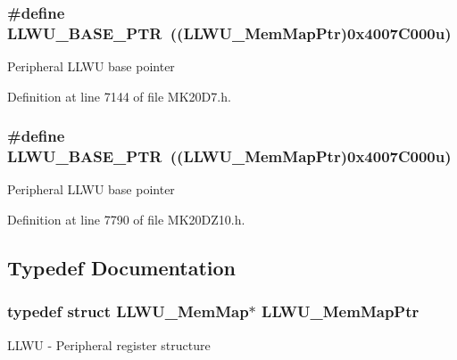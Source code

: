 \subsubsection[{\texorpdfstring{L\+L\+W\+U\+\_\+\+B\+A\+S\+E\+\_\+\+P\+TR}{LLWU_BASE_PTR}}]{\setlength{\rightskip}{0pt plus 5cm}\#define L\+L\+W\+U\+\_\+\+B\+A\+S\+E\+\_\+\+P\+TR~(({\bf L\+L\+W\+U\+\_\+\+Mem\+Map\+Ptr})0x4007\+C000u)}\hypertarget{group___l_l_w_u___peripheral_ga89c97b9e8756088cb3d8617c022ae6ac}{}\label{group___l_l_w_u___peripheral_ga89c97b9e8756088cb3d8617c022ae6ac}
Peripheral L\+L\+WU base pointer 

Definition at line 7144 of file M\+K20\+D7.\+h.

\subsubsection[{\texorpdfstring{L\+L\+W\+U\+\_\+\+B\+A\+S\+E\+\_\+\+P\+TR}{LLWU_BASE_PTR}}]{\setlength{\rightskip}{0pt plus 5cm}\#define L\+L\+W\+U\+\_\+\+B\+A\+S\+E\+\_\+\+P\+TR~(({\bf L\+L\+W\+U\+\_\+\+Mem\+Map\+Ptr})0x4007\+C000u)}\hypertarget{group___l_l_w_u___peripheral_ga89c97b9e8756088cb3d8617c022ae6ac}{}\label{group___l_l_w_u___peripheral_ga89c97b9e8756088cb3d8617c022ae6ac}
Peripheral L\+L\+WU base pointer 

Definition at line 7790 of file M\+K20\+D\+Z10.\+h.



\subsection{Typedef Documentation}
\subsubsection[{\texorpdfstring{L\+L\+W\+U\+\_\+\+Mem\+Map\+Ptr}{LLWU_MemMapPtr}}]{\setlength{\rightskip}{0pt plus 5cm}typedef struct {\bf L\+L\+W\+U\+\_\+\+Mem\+Map}$\ast$ {\bf L\+L\+W\+U\+\_\+\+Mem\+Map\+Ptr}}\hypertarget{group___l_l_w_u___peripheral_ga03cfefad45ecbfeb2cd16eb85ccfe186}{}\label{group___l_l_w_u___peripheral_ga03cfefad45ecbfeb2cd16eb85ccfe186}
L\+L\+WU -\/ Peripheral register structure 
